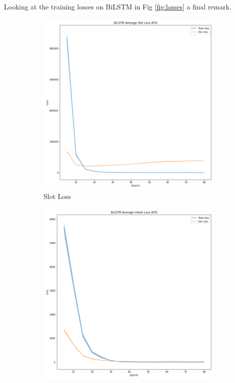 \documentclass[a4paper]{article}
\begin{document}
Looking at the training losses on BiLSTM in Fig \ref{fig:losses} a final remark.
\begin{figure}[h!]
	\centering
	\begin{subfigure}[b]{0.22\textwidth}
		\centering
		\includegraphics[width=\textwidth]{"../assets/images/losses/BiLSTM Average Slot Loss ATIS.png"}
				\caption{Slot Loss}
	\end{subfigure}	
	\hfill
	\begin{subfigure}[b]{0.22\textwidth}
		\centering
		\includegraphics[width=\textwidth]{"../assets/images/losses/BiLSTM Average Intent Loss ATIS.png"}

\end{subfigure}
\end{figure}
\end{document}
